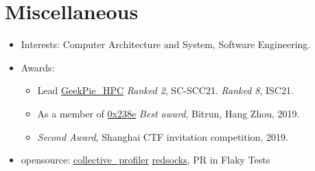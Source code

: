 \documentclass{resume}
\newcommand{\en}[1]{#1}
\newcommand{\zh}[1]{}
\begin{document}
\section{\en{Miscellaneous}\zh{其他}}
\begin{itemize}
      \item \en{Interests: Computer Architecture and System, Software Engineering.}
            \zh{兴趣：高性能计算、存储、形式化验证安全等。}
      \item \en{Awards:}
      \zh{所获奖项：}
      \begin{itemize}
      \item \en{Lead \href{https://hpc.geekpie.club}{GeekPie\_HPC} \textit{Ranked 2}, SC-SCC21. \textit{Ranked 8}, ISC21.}
            \zh{带领\href{https://hpc.geekpie.club}{GeekPie\_HPC} SCC20 团队第9名，SCC21 团队第2名，ISC21 团队第8名}
      \item \en{As a member of \href{https://github.com/0x238e/Vchain}{0x238e} \textit{Best award}, Bitrun, Hang Zhou, 2019.}
            \zh{带领\href{https://github.com/0x238e/Vchain}{0x238e} Bitrun Hackathon 比赛最佳奖}
      \item \en{\textit{Second Award}, Shanghai CTF invitation competition, 2019.}
            \zh{上海2019年 CTF 邀请赛比赛二等奖}
      \end{itemize}
      \item \en{opensource: \href{https://github.com/geekpiehpc/collective_profiler}{collective\_profiler} \href{https://github.com/victoryang00/redsocks-m1}{redsocks}, PR in Flaky Tests}
      \zh{开源项目贡献：\href{https://github.com/geekpiehpc/collective_profiler}{collective\_profiler} \href{https://github.com/victoryang00/redsocks-m1}{redsocks}, PR in Flaky Tests}
\end{itemize}
\end{document}
